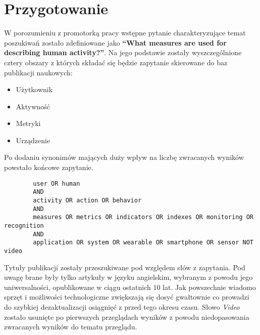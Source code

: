 \section{Przygotowanie}
W porozumieniu z promotorką pracy wstępne pytanie charakteryzujące temat poszukiwań zostało zdefiniowane jako \textbf{``What measures are used for describing human activity?''}. Na jego podstawie zostały wyszczególnione cztery obszary z których składać się będzie zapytanie skierowane do baz publikacji naukowych:
\begin{itemize}
    \item Użytkownik
    \item Aktywność
    \item Metryki
    \item Urządzenie
\end{itemize}

Po dodaniu synonimów mających duży wpływ na liczbę zwracanych wyników powstało końcowe zapytanie. 
\begin{center}
	\begin{minipage}{0.85\linewidth}
		\begin{verbatim}
		user OR human
		AND
		activity OR action OR behavior
		AND
		measures OR metrics OR indicators OR indexes OR monitoring OR recognition
		AND
		application OR system OR wearable OR smartphone OR sensor NOT video
		\end{verbatim}
	\end{minipage}
\end{center}

Tytuły publikacji zostały przeszukiwane pod względem słów z zapytania. Pod uwagę brane były tylko artykuły w języku angielskim, wybranym z powodu jego uniwersalności, opublikowane w ciągu ostatnich 10 lat. Jak powszechnie wiadomo sprzęt i możliwości technologiczne zwiększają się dosyć gwałtownie co prowadzi do szybkiej dezaktualizacji osiągnięć z przed tego okresu czasu. Słowo \textit{Video} zostało usunięte po pierwszych przeglądach wyników z powodu niedopasowania zwracanych wyników do tematu przeglądu.
